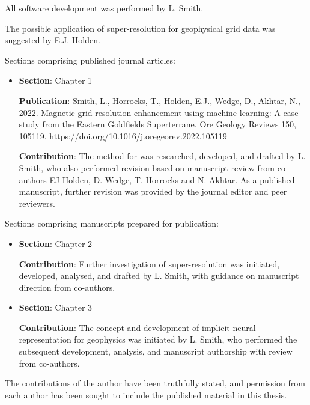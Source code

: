 \documentclass[12pt,a4paper]{report} %
\begin{document}
\smallskip{}
\noindent{}All software development was performed by L. Smith.

\noindent{}The possible application of super-resolution for geophysical grid data was suggested by E.J. Holden.

\medskip{}
\noindent{}Sections comprising published journal articles:
\begin{itemize}
    \item{}\textbf{Section}: Chapter 1

    \textbf{Publication}: Smith, L., Horrocks, T., Holden, E.J., Wedge, D., Akhtar, N., 2022. Magnetic grid resolution enhancement using machine learning: A case study from the Eastern Goldfields Superterrane. Ore Geology Reviews 150, 105119. https://doi.org/10.1016/j.oregeorev.2022.105119

    \textbf{Contribution}: The method for was researched, developed, and drafted by L. Smith, who also performed revision based on manuscript review from co-authors EJ Holden, D. Wedge, T. Horrocks and N. Akhtar.
    As a published manuscript, further revision was provided by the journal editor and peer reviewers.
\end{itemize}

\noindent{}Sections comprising manuscripts prepared for publication:
\begin{itemize}
    \item{}
    \textbf{Section}: Chapter 2

    \textbf{Contribution}: Further investigation of super-resolution was initiated, developed, analysed, and drafted by L. Smith, with guidance on manuscript direction from co-authors.

    \item{}
    \textbf{Section}: Chapter 3

    \textbf{Contribution}: The concept and development of implicit neural representation for geophysics was initiated by L. Smith, who performed the subsequent development, analysis, and manuscript authorship with review from co-authors.

\end{itemize}


\noindent{}The contributions of the author have been truthfully stated, and permission from
each author has been sought to include the published material in this thesis.

\end{document}
